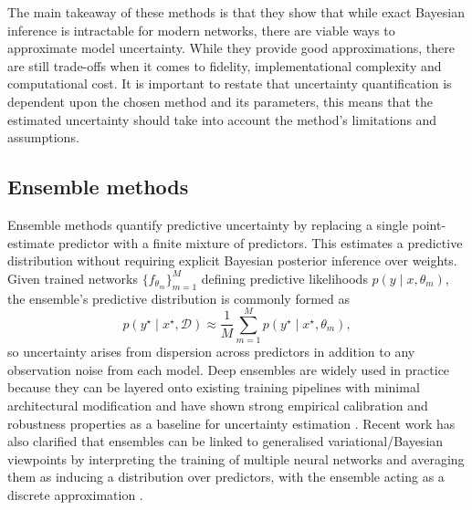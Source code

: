 The main takeaway of these methods is that they show that while exact Bayesian inference is intractable for modern networks, there are viable ways to approximate model uncertainty. While they provide good approximations, there are still trade-offs when it comes to fidelity, implementational complexity and computational cost. It is important to restate that uncertainty quantification is dependent upon the chosen method and its parameters, this means that the estimated uncertainty should take into account the method's limitations and assumptions.


\subsection{Ensemble methods}

Ensemble methods quantify predictive uncertainty by replacing a single point-estimate predictor with a finite mixture of predictors. This estimates a predictive distribution without requiring explicit Bayesian posterior inference over weights. Given trained networks $\{f_{\theta_m}\}_{m=1}^M$ defining predictive likelihoods $p(y\mid x,\theta_m)$, the ensemble's predictive distribution is commonly formed as
\begin{equation}
p(y^\star \mid x^\star, \mathcal{D}) \approx \frac{1}{M}\sum_{m=1}^M p\!\left(y^\star \mid x^\star, \theta_m\right),
\end{equation}
so uncertainty arises from dispersion across predictors in addition to any observation noise from each model. Deep ensembles are widely used in practice because they can be layered onto existing training pipelines with minimal architectural modification and have shown strong empirical calibration and robustness properties as a baseline for uncertainty estimation \cite{Lakshminarayanan2017}. Recent work has also clarified that ensembles can be linked to generalised variational/Bayesian viewpoints by interpreting the training of multiple neural networks and averaging them as inducing a distribution over predictors, with the ensemble acting as a discrete approximation \cite{Wild2023}.

